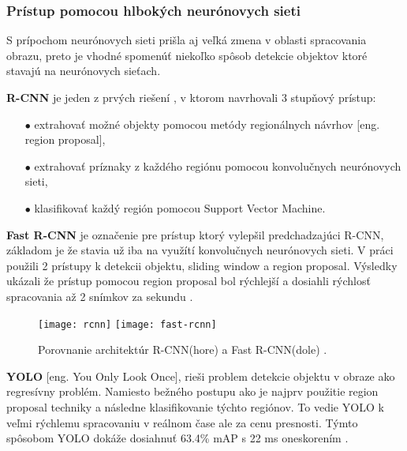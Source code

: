 \subsubsection{Prístup pomocou hlbokých neurónovych sieti}
S prípochom neurónovych sieti prišla aj veľká zmena v oblasti spracovania obrazu, preto je vhodné spomenúť niekoľko spôsob
    detekcie objektov ktoré stavajú na neurónovych sieťach.

\textbf{R-CNN} je jeden z prvých riešení \cite{prop:rcnn}, v ktorom navrhovali 3 stupňový prístup:
\begin{enumerate}
	\item[$\bullet$] extrahovať možné objekty pomocou metódy regionálnych návrhov [eng. region proposal],
    \item[$\bullet$] extrahovať príznaky z každého regiónu pomocou konvolučnych neurónovych sieti,
    \item[$\bullet$] klasifikovať každý región pomocou Support Vector Machine.
\end{enumerate}

\textbf{Fast R-CNN} je označenie pre prístup ktorý vylepšil predchadzajúci R-CNN, základom je že stavia už iba na využítí konvolučnych neurónovych sieti.
V práci použili 2 prístupy k detekcii objektu, sliding window a region proposal.
Výsledky ukázali že prístup pomocou region proposal bol rýchlejší a dosiahli rýchlosť spracovania až 2 snímkov za sekundu \cite{prop:fast-rcnn}.
\begin{figure}[H]
    \centering
    \texttt{[image: rcnn]}
    \qquad
    \texttt{[image: fast-rcnn]}
    \caption{Porovnanie architektúr R-CNN(hore) a Fast R-CNN(dole) \cite{odkaz:ObjectDetectionOverview}.}
    \label{pic:FastRCNN}
\end{figure}

\textbf{YOLO} [eng. You Only Look Once], rieši problem detekcie objektu v obraze ako regresívny problém.
Namiesto bežného postupu ako je najprv použitie region proposal techniky a následne klasifikovanie týchto regiónov.
To vedie YOLO k veľmi rýchlemu spracovaniu v reálnom čase ale za cenu presnosti.
Týmto spôsobom YOLO dokáže dosiahnuť 63.4\% mAP s 22 ms oneskorením \cite{prop:Redmon2016YouOL}.

